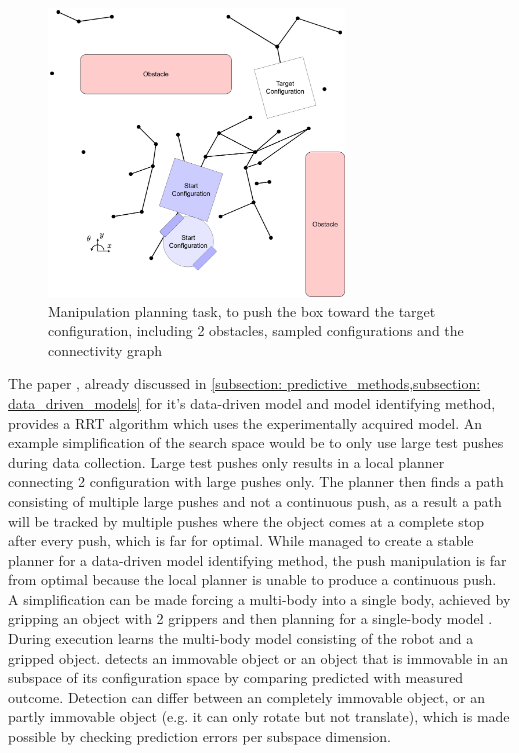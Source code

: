 \begin{figure}[H]
    \centering
    \includegraphics[width=0.7\textwidth]{figures/motion_planning_robot_and_square_object.png}
    \caption{Manipulation planning task, to push the box toward the target configuration, including 2 obstacles, sampled configurations and the connectivity graph}
    \label{figure: multi_body_motion_task}
\end{figure}

The paper \cite{mericli_push-manipulation_2015}, already discussed in \cref{subsection: predictive_methods,subsection: data_driven_models} for it's data-driven model and model identifying method, provides a \ac{RRT} algorithm which uses the experimentally acquired model. An example simplification of the search space would be to only use large test pushes during data collection. Large test pushes only results in a local planner connecting 2 configuration with large pushes only. The planner then finds a path consisting of multiple large pushes and not a continuous push, as a result a path will be tracked by multiple pushes where the object comes at a complete stop after every push, which is far for optimal. While \cite{mericli_push-manipulation_2015} managed to create a stable planner for a data-driven model identifying method, the push manipulation is far from optimal because the local planner is unable to produce a continuous push. \\

A simplification can be made forcing a multi-body into a single body, achieved by gripping an object with 2 grippers and then planning for a single-body model \cite{scholz_navigation_2016}. During execution \cite{scholz_navigation_2016} learns the multi-body model consisting of the robot and a gripped object. \cite{scholz_navigation_2016} detects an immovable object or an object that is immovable in an subspace of its configuration space by comparing predicted with measured outcome. Detection can differ between an completely immovable object, or an partly immovable object (e.g. it can only rotate but not translate), which is made possible by checking prediction errors per subspace dimension.\\

